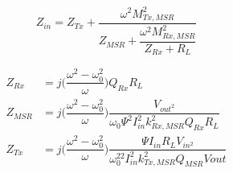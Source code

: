 \documentclass[journal]{IEEEtran}
\begin{document}
\begin{equation}
Z_{in}= Z_{Tx}+ \dfrac{\omega^2M_{Tx,MSR}^2}{Z_{MSR}+\dfrac{\omega^2M_{Rx,MSR}^2}{Z_{Rx}+R_L}}
    \label{eq:Zin_1}
\end{equation}

\begin{equation}
\label{eq:ZrxMSR}
    \begin{split}
    Z_{Rx} &= j \bigg(\dfrac{\omega^2-\omega_0^2}{\omega}\bigg) Q_{Rx} R_L \\
    Z_{MSR} &=j \bigg(\dfrac{\omega^2-\omega_0^2}{\omega} \bigg) \dfrac{V_{out^2}}{\omega_0\Psi^2I_{in}^2k_{Rx,MSR}^2Q_{Rx}R_L} \\
    Z_{Tx} &=j \bigg(\dfrac{\omega^2-\omega_0^2}{\omega}\bigg) \dfrac{\Psi I_{in}R_LV_{in^2}}{\omega_0^22I_{in}^2k_{Tx,MSR}^2Q_{MSR}Vout} \\
    \end{split}
\end{equation}
\end{document}
